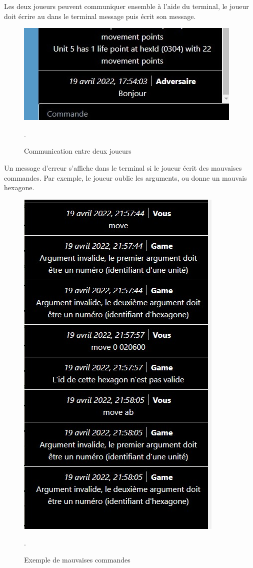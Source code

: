 Les deux joueurs peuvent communiquer ensemble  à l'aide du terminal, le joueur doit écrire au dans le terminal \og message \fg{} puis écrit son message.\\
\begin{figure}[H]
\centering
\includegraphics[scale=0.6]{data/chat.jpg}
\caption{Communication entre deux joueurs}.
\end{figure}

Un message d'erreur s'affiche dans le terminal si le joueur écrit  des mauvaises commandes.
Par exemple, le joueur oublie les arguments, ou donne un mauvais hexagone.\\

\begin{figure}[H]
\centering
\includegraphics[scale=0.6]{data/erreur.jpg}
\caption{Exemple de mauvaises commandes}.
\end{figure}

